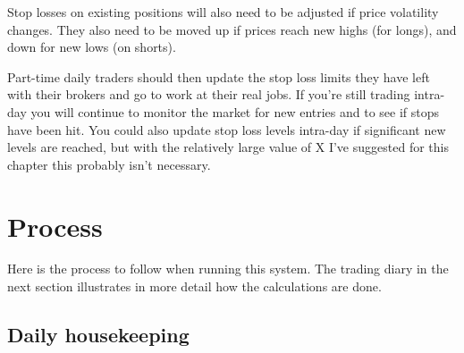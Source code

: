 Stop losses on existing positions will also need to be adjusted if price volatility changes. They also need to be moved up if prices reach new highs (for longs), and down for new lows (on shorts).

Part-time daily traders should then update the stop loss limits they have left with their brokers and go to work at their real jobs. If you're still trading intra-day you will continue to monitor the market for new entries and to see if stops have been hit. You could also update stop loss levels intra-day if significant new levels are reached, but with the relatively large value of X I've suggested for this chapter this probably isn't necessary.

\section*{Process}  {}

Here is the process to follow when running this system. The trading diary in the next section illustrates in more detail how the calculations are done.

\subsection*{Daily housekeeping}


